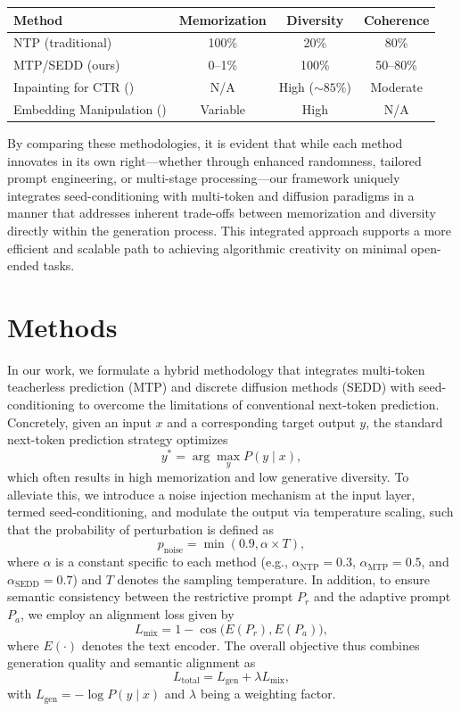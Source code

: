 \documentclass{article} %
\begin{document}
\begin{center}
\begin{tabular}{|l|c|c|c|}
\label{tab:related}
\hline
Method & Memorization & Diversity & Coherence \\ \hline
NTP (traditional) & 100\% & 20\% & 80\% \\ \hline
MTP/SEDD (ours) & 0--1\% & 100\% & 50--80\% \\ \hline
Inpainting for CTR (\cite{yang2024new}) & N/A & High (\(\sim85\%\)) & Moderate \\ \hline
Embedding Manipulation (\cite{deckers2023manipulating}) & Variable & High & N/A \\ \hline
\end{tabular}
\end{center}

By comparing these methodologies, it is evident that while each method innovates in its own right—whether through enhanced randomness, tailored prompt engineering, or multi-stage processing—our framework uniquely integrates seed-conditioning with multi-token and diffusion paradigms in a manner that addresses inherent trade-offs between memorization and diversity directly within the generation process. This integrated approach supports a more efficient and scalable path to achieving algorithmic creativity on minimal open-ended tasks.

\section{Methods}
In our work, we formulate a hybrid methodology that integrates multi-token teacherless prediction (MTP) and discrete diffusion methods (SEDD) with seed-conditioning to overcome the limitations of conventional next-token prediction. Concretely, given an input \( x \) and a corresponding target output \( y \), the standard next-token prediction strategy optimizes
\[
y^* = \arg\max_{y} P(y \mid x),
\]
which often results in high memorization and low generative diversity. To alleviate this, we introduce a noise injection mechanism at the input layer, termed seed-conditioning, and modulate the output via temperature scaling, such that the probability of perturbation is defined as 
\[
p_{\text{noise}} = \min(0.9, \alpha \times T),
\]
where \( \alpha \) is a constant specific to each method (e.g., \( \alpha_{\text{NTP}}=0.3 \), \( \alpha_{\text{MTP}}=0.5 \), and \( \alpha_{\text{SEDD}}=0.7 \)) and \( T \) denotes the sampling temperature. In addition, to ensure semantic consistency between the restrictive prompt \( P_r \) and the adaptive prompt \( P_a \), we employ an alignment loss given by
\[
L_{\text{mix}} = 1 - \cos\big(E(P_r), E(P_a)\big),
\]
where \( E(\cdot) \) denotes the text encoder. The overall objective thus combines generation quality and semantic alignment as
\[
L_{\text{total}} = L_{\text{gen}} + \lambda L_{\text{mix}},
\]
with \( L_{\text{gen}} = -\log P(y\mid x) \) and \(\lambda\) being a weighting factor.
\end{document}
